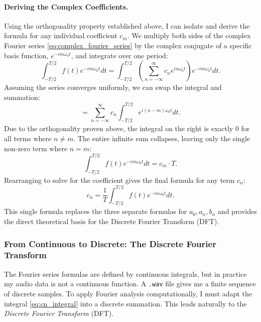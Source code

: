 \documentclass{article}
\begin{document}
\paragraph{Deriving the Complex Coefficients.}
Using the orthogonality property established above, I can isolate and derive the formula for any individual coefficient $c_m$. We multiply both sides of the complex Fourier series \eqref{eq:complex_fourier_series} by the complex conjugate of a specific basis function, $e^{-im\omega_0 t}$, and integrate over one period:
\begin{equation*}
    \int_{-T/2}^{T/2} f(t) e^{-im\omega_0 t} dt = \int_{-T/2}^{T/2} \left( \sum_{n=-\infty}^{\infty} c_n e^{in\omega_0 t} \right) e^{-im\omega_0 t} dt.
\end{equation*}
Assuming the series converges uniformly, we can swap the integral and summation:
\begin{equation*}
    = \sum_{n=-\infty}^{\infty} c_n \int_{-T/2}^{T/2} e^{i(n-m)\omega_0 t} dt.
\end{equation*}
Due to the orthogonality proven above, the integral on the right is exactly $0$ for all terms where $n \neq m$. The entire infinite sum collapses, leaving only the single non-zero term where $n=m$:
\begin{equation*}
    \int_{-T/2}^{T/2} f(t) e^{-im\omega_0 t} dt = c_m \cdot T.
\end{equation*}
Rearranging to solve for the coefficient gives the final formula for any term $c_n$:
\begin{equation}
    c_n = \frac{1}{T} \int_{-T/2}^{T/2} f(t) e^{-in\omega_0 t} dt.
    \label{eq:cn_integral}
\end{equation}
This single formula replaces the three separate formulas for $a_0, a_n, b_n$ and provides the direct theoretical basis for the Discrete Fourier Transform (DFT).

    \subsubsection{From Continuous to Discrete: The Discrete Fourier Transform}

The Fourier series formulas are defined by continuous integrals, but in practice my audio 
data is not a continuous function. A \texttt{.wav} file gives me a finite sequence of discrete samples. 
To apply Fourier analysis computationally, I must adapt the integral \eqref{eq:cn_integral} into a discrete 
summation. This leads naturally to the \emph{Discrete Fourier Transform} (DFT).
\end{document}
